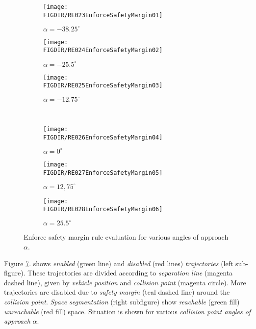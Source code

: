     \begin{figure}[H]
    	\centering
        \begin{subfigure}{0.32\textwidth}
        	\centering
            \texttt{[image: \\FIGDIR/RE023EnforceSafetyMargin01]} 
            \vfill
            \caption{$\alpha=-38.25^\circ$}
            \label{fig:ruleEnforceSafetyMargin01}
        \end{subfigure}
        \begin{subfigure}{0.32\textwidth}
        	\centering
            \texttt{[image: \\FIGDIR/RE024EnforceSafetyMargin02]} 
            \vfill
            \caption{$\alpha=-25.5^\circ$}
            \label{fig:ruleEnforceSafetyMargin02}
        \end{subfigure}
        \begin{subfigure}{0.32\textwidth}
        	\centering
            \texttt{[image: \\FIGDIR/RE025EnforceSafetyMargin03]} 
            \vfill
            \caption{$\alpha=-12.75^\circ$}
            \label{fig:ruleEnforceSafetyMargin03}
        \end{subfigure}
        \\
        \begin{subfigure}{0.32\textwidth}
        	\centering
            \texttt{[image: \\FIGDIR/RE026EnforceSafetyMargin04]} 
            \vfill
            \caption{$\alpha=0^\circ$}
            \label{fig:ruleEnforceSafetyMargin04}
        \end{subfigure}
        \begin{subfigure}{0.32\textwidth}
        	\centering
            \texttt{[image: \\FIGDIR/RE027EnforceSafetyMargin05]} 
            \vfill
            \caption{$\alpha=12,75^\circ$}
            \label{fig:ruleEnforceSafetyMargin05}
        \end{subfigure}
        \begin{subfigure}{0.32\textwidth}
        	\centering
            \texttt{[image: \\FIGDIR/RE028EnforceSafetyMargin06]} 
            \vfill
            \caption{$\alpha=25.5^\circ$}
            \label{fig:ruleEnforceSafetyMargin06}
        \end{subfigure}
        \caption{Enforce safety margin rule evaluation for various angles of approach $\alpha$.}        
        \label{fig:ruleEnforceSafetyMarginGeneral}
    \end{figure}
    
    \noindent Figure \ref{fig:ruleEnforceSafetyMarginGeneral}. shows \emph{enabled} (green line) and \emph{disabled} (red lines) \emph{trajectories} (left sub-figure). These trajectories are divided according to \emph{separation line} (magenta dashed line), given by \emph{vehicle position} and \emph{collision point} (magenta circle). More trajectories are disabled due to \emph{safety  margin} (teal dashed line) around the  \emph{collision point}. \emph{Space segmentation} (right subfigure) show \emph{reachable} (green fill) \emph{unreachable} (red fill) space. Situation is shown for various \emph{collision point angles of approach} $\alpha$.
    
